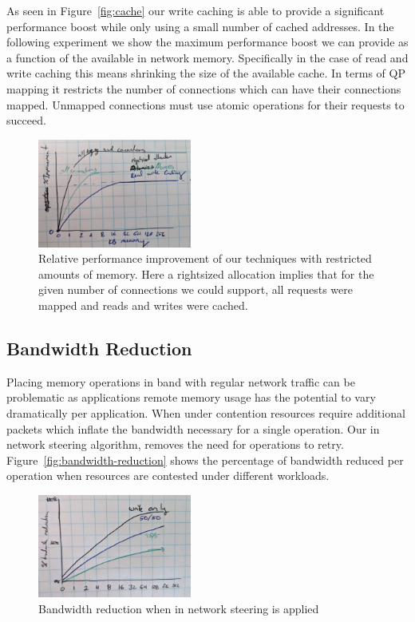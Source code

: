 As seen in Figure~\ref{fig:cache} our write caching is able to provide a
significant performance boost while only using a small number of cached
addresses. In the following experiment we show the maximum performance boost we
can provide as a function of the available in network memory. Specifically in
the case of read and write caching this means shrinking the size of the
available cache. In terms of QP mapping it restricts the number of connections
which can have their connections mapped. Unmapped connections must use atomic
operations for their requests to succeed.

\begin{figure}
    \includegraphics[width=0.45\textwidth]{fig/memory_util.jpg}
    \caption{{Relative performance improvement of our techniques with restricted amounts of memory. Here a rightsized allocation implies that for the given number of connections we could support, all requests were mapped and reads and writes were cached.}}
    \label{fig:memory_util}
\end{figure}



\subsection{Bandwidth Reduction}

Placing memory operations in band with regular network traffic can be
problematic as applications remote memory usage has the potential to vary
dramatically per application. When under contention resources require additional
packets which inflate the bandwidth necessary for a single operation. Our in
network steering algorithm, removes the need for operations to retry.
Figure~\ref{fig:bandwidth-reduction} shows the percentage of bandwidth reduced
per operation when resources are contested under different workloads.

\begin{figure}
    \includegraphics[width=0.45\textwidth]{fig/bandwidth_reduction.jpg}
    \caption{{Bandwidth reduction when in network steering is applied}}
    \label{fig:bandwidth_reduction}
\end{figure}

